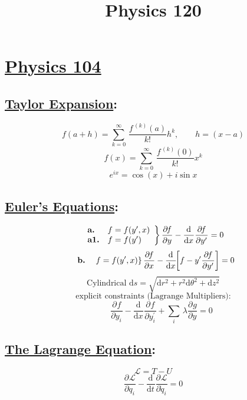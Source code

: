 \documentclass[fleqn]{article}
\title{\vspace{1mm}Physics 120}
\date{}
\begin{document}
\newcommand{\myint}[4]{\int_{#1}^{#2} \!  #3  \, \mathrm{d} #4}
\newcommand{\paren}[1]{\!\left({#1}\right)}
\newcommand{\commutator}[2]{\left[ #1\, , #2\right]}
\newcommand{\expec}[1]{\! \left\langle {#1}\right\rangle}
\newcommand{\expect}[1]{\! \langle {#1}\rangle}
\newcommand{\mysum}[3]{\sum_{#1}^{#2} \, #3 }
\newcommand{\pdiv}[3]{ \frac{\partial^{#3}{#1}}{\partial{#2}^{#3} } }
\newcommand{\deriv}[3]{ \frac{\mathrm{d}^{#3}{#1}}{\mathrm{d}{#2}^{#3} } }
\newcommand{\braket}[1]{\!\left| #1 \right\rangle}
\newcommand{\half}[0]{\frac{1}{2}}


\section*{\centering \underline{Physics 104}}
\begin{multicols*}{3}

\subsection*{ \centering \underline{Taylor Expansion}:}
\[f\paren{a+h} = \mysum{k=0}{\infty}{\frac{f^{\,\paren{k}}\paren{a}}{k!}h^{k}},\qquad h = \paren{x-a}\]
\[f\paren{x} = \mysum{k=0}{\infty}{\frac{f^{\,\paren{k}}\paren{0}}{k!}x^{k}}\]
\[e^{ix} = \cos\paren{x} + i\sin{x}\]

\subsection*{ \centering \underline{Euler's Equations}:}
\[  \left. \begin{array}{ll}
              \mbox{\textbf{a.}} &  f = f\paren{y^\prime,x}\\
             \mbox{\textbf{a1.}} & f = f\paren{y^\prime} \end{array} \right\} \pdiv{\!f}{y}{} - \deriv{}{x}{}\pdiv{\!f}{y^\prime}{} = 0\]
\[\quad\!\!\mbox{\textbf{b.}}\quad \left. f = f\paren{y^\prime,x} \right\} \pdiv{\!f}{x}{} - \deriv{}{x}{}\!\!\left[f - y^\prime\pdiv{\!f}{y^\prime}{} \right] = 0 \]
\[\mbox{Cylindrical d$s$} = \sqrt{\mathrm{d}r^2 + r^2\mathrm{d}\theta^2 + \mathrm{d}z^2}\]
\[\mbox{explicit constraints (Lagrange Multipliers):}\]
\[\qquad\pdiv{\!f}{y_{i}}{} - \deriv{}{x}{}\pdiv{\!f}{y^\prime_{i}}{} + \mysum{i}{}{\lambda\pdiv{g}{y}{}} = 0\]

\subsection*{ \centering \underline{The Lagrange Equation}:}
\[\mathcal{L} = T - U\]
\[\pdiv{\mathcal{L}}{q_{i}}{} - \deriv{}{t}{}\pdiv{\mathcal{L}}{\dot{q}_{i}}{}=0\]


\end{multicols*}
\end{document}
